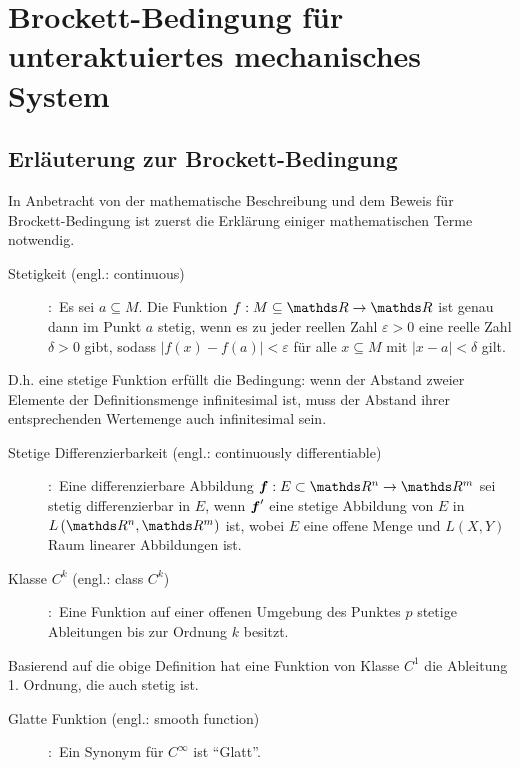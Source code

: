 \chapter{Brockett-Bedingung für unteraktuiertes mechanisches System}
\label{Brockett_Bedingung_für_unteraktuiertes_mechanisches_System}

\section{Erläuterung zur Brockett-Bedingung}
\label{Erläuterung zur Brockett-Bedingung}
In Anbetracht von der mathematische Beschreibung und dem Beweis für Brockett-Bedingung ist zuerst die Erklärung einiger mathematischen Terme notwendig.    
\begin{description} 
	\item[Stetigkeit (engl.: continuous)]
	\cite[S.250]{grosche2003teubner}:~Es sei $a\subseteq M$. Die Funktion $f:M\subseteq\Reals\to\Reals$ ist genau dann im Punkt $a$ stetig, wenn es zu jeder reellen Zahl $\varepsilon>0$ eine reelle Zahl $\delta>0$ gibt, sodass
	$\left | f\left ( x \right )-f\left ( a \right ) \right |< \varepsilon$ für alle $x\subseteq M$ mit $\left | x-a \right |< \delta $ gilt.  
\end{description}
\vspace{-0.8em}
D.h. eine stetige Funktion erfüllt die Bedingung: wenn der Abstand zweier Elemente der Definitionsmenge infinitesimal ist, muss der Abstand ihrer entsprechenden Wertemenge auch infinitesimal sein.
\begin{description}
	\item[Stetige Differenzierbarkeit (engl.: continuously differentiable)]
	\cite[S.256]{rudin2009analysis}:~Eine differenzierbare Abbildung $\vect{f}:E\subset\Reals^{n}\to \Reals^{m}$ sei stetig differenzierbar in $E$, wenn ${\boldsymbol f}'$ eine stetige Abbildung von $E$ in $L\left ( \Reals^{n},\Reals^{m} \right )$ ist, wobei $E$ eine offene Menge und $L\left ( X,Y \right )$ Raum linearer Abbildungen ist.
	\item[Klasse $C^{k}$ (engl.: class $C^{k}$)]
	\cite[S.265]{grosche2003teubner}:~Eine Funktion auf einer offenen Umgebung des Punktes $p$ stetige Ableitungen bis zur Ordnung $k$ besitzt.
\end{description}
\vspace{-0.8em}
Basierend auf die obige Definition hat eine Funktion von Klasse $C^{1}$ die Ableitung 1. Ordnung, die auch stetig ist.
\begin{description}
	\item[Glatte Funktion (engl.: smooth function)]
	\cite[S.5]{tu2010introduction}:~Ein Synonym für $C^{\infty}$ ist ``Glatt''.
\end{description}
